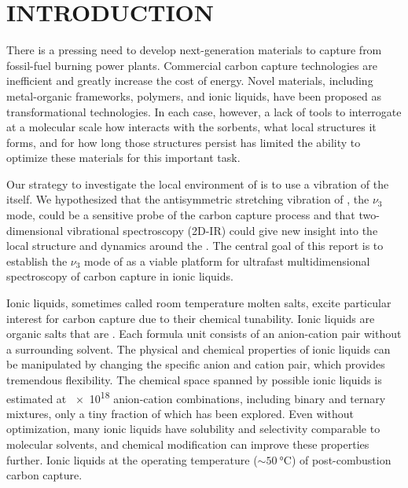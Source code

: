 \documentclass[%
  class = book,%
  crop = false,%
  float = true,%
  multi = true,%
  preview = false,%
]{standalone}
\let\cite\autocite
\newcommand{\caps}[1]{\uppercase{#1}}
\begin{document}
\section{\texorpdfstring{\caps{Introduction}}{Introduction}}
\label{sec:anions_intro}

There is a pressing need to develop next-generation materials to capture  from fossil-fuel burning power plants. Commercial carbon capture technologies are inefficient and greatly increase the cost of energy\cite{Bhown2011}. Novel materials, including metal-organic frameworks,\cite{millwardJACS-05,sumidaCR-12} polymers,\cite{Du2011,Dawson2011} and ionic liquids,\cite{batesJACS-02,Karadas2010,baraACR-10} have been proposed as transformational technologies. In each case, however, a lack of tools to interrogate at a molecular scale how  interacts with the sorbents, what local structures it forms, and for how long those structures persist has limited the ability to optimize these materials for this important task.

Our strategy to investigate the local environment of  is to use a vibration of the  itself. We hypothesized that the antisymmetric stretching vibration of , the \(\nu_3\) mode, could be a sensitive probe of the carbon capture process and that  two-dimensional vibrational spectroscopy (2D-IR) could give new insight into the local structure and dynamics around the . The central goal of this report is to establish the \(\nu_3\) mode of  as a viable platform for ultrafast multidimensional spectroscopy of carbon capture in ionic liquids.

Ionic liquids, sometimes called room temperature molten salts, excite particular interest for carbon capture due to their chemical tunability. Ionic liquids are organic salts that are . Each formula unit consists of an anion-cation pair without a surrounding solvent. The physical and chemical properties of ionic liquids can be manipulated by changing the specific anion and cation pair, which provides tremendous flexibility. The chemical space spanned by possible ionic liquids is estimated at \num{e18} anion-cation combinations, including binary and ternary mixtures,\cite{Holbrey1999} only a tiny fraction of which has been explored.
Even without optimization, many ionic liquids have  solubility and selectivity comparable to molecular solvents,\cite{Bara2009,Cadena2004} and chemical modification can improve these properties further.\cite{Gurkan2010,seoJPCB-14} Ionic liquids  at the operating temperature (\(\sim \SI{50}{\celsius}\)) of post-combustion carbon capture.
\end{document}
